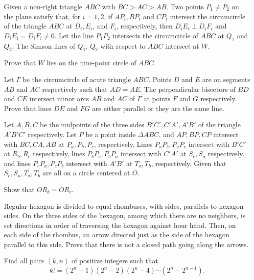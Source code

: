 \documentclass[11pt]{scrartcl}
\begin{document}
\begin{problem}[8895719454292056765]
Given a non-right triangle $ABC$ with $BC>AC>AB$. Two points $P_1 \neq P_2$ on the plane satisfy that, for $i=1,2$, if $AP_i, BP_i$ and $CP_i$ intersect the circumcircle of the triangle $ABC$ at $D_i, E_i$, and $F_i$, respectively, then $D_iE_i \perp D_iF_i$ and $D_iE_i = D_iF_i \neq 0$. Let the line $P_1P_2$ intersects the circumcircle of $ABC$ at $Q_1$ and $Q_2$. The Simson lines of $Q_1$, $Q_2$ with respect to $ABC$ intersect at $W$.

Prove that $W$ lies on the nine-point circle of $ABC$.
\end{problem}
\begin{problem}[625002281186392279]
	Let $\Gamma$ be the circumcircle of acute triangle $ABC$. Points $D$ and $E$ are on segments $AB$ and $AC$ respectively such that $AD = AE$. The perpendicular bisectors of $BD$ and $CE$ intersect minor arcs $AB$ and $AC$ of $\Gamma$ at points $F$ and $G$ respectively. Prove that lines $DE$ and $FG$ are either parallel or they are the same line.
\end{problem}
\begin{problem}[5261846980754565299]
	Let $A,B,C$ be the midpoints of the three sides $B'C', C'A', A'B'$ of the triangle $A'B'C'$ respectively. Let $P$ be a point inside $\Delta ABC$, and $AP,BP,CP$ intersect with $BC, CA, AB$ at $P_a,P_b,P_c$, respectively. Lines $P_aP_b, P_aP_c$ intersect with $B'C'$ at $R_b, R_c$ respectively, lines $P_bP_c, P_bP_a$ intersect with $C'A'$ at $S_c, S_a$ respectively. and lines $P_cP_a, P_cP_b$ intersect with $A'B'$ at $T_a, T_b$, respectively. Given that $S_c,S_a, T_a, T_b$ are all on a circle centered at $O$.

Show that $OR_b=OR_c$.
\end{problem}
\begin{problem}[6576585943791349484]
Regular hexagon is divided to equal rhombuses, with sides, parallels to hexagon sides. On the three sides of the hexagon, among which there are no neighbors, is set directions in order of traversing the hexagon against hour hand. Then, on each side of the rhombus, an arrow directed just as the side of the hexagon parallel to this side. Prove that there is not a closed path going along the arrows.
\end{problem}
\begin{problem}[16776483958513]
Find all pairs $(k,n)$ of positive integers such that\[ k!=(2^n-1)(2^n-2)(2^n-4)\cdots(2^n-2^{n-1}). \]
\end{problem}
\end{document}
